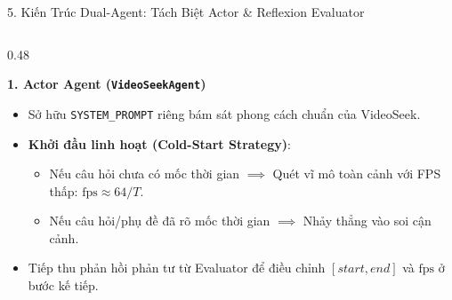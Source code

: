 \documentclass[aspectratio=169, 10pt]{beamer}
\begin{document}
\begin{frame}{5. Kiến Trúc Dual-Agent: Tách Biệt Actor \& Reflexion Evaluator}
    \begin{columns}[T]
        \begin{column}{0.48\textwidth}
            \begin{block}{\textbf{1. Actor Agent (\texttt{VideoSeekAgent})}}
                \begin{itemize}
                    \item Sở hữu \texttt{SYSTEM\_PROMPT} riêng bám sát phong cách chuẩn của VideoSeek.
                    \item \textbf{Khởi đầu linh hoạt (Cold-Start Strategy)}:
                    \begin{itemize}\footnotesize
                        \item Nếu câu hỏi chưa có mốc thời gian $\implies$ Quét vĩ mô toàn cảnh với FPS thấp: $\text{fps} \approx 64 / T$.
                        \item Nếu câu hỏi/phụ đề đã rõ mốc thời gian $\implies$ Nhảy thẳng vào soi cận cảnh.
                    \end{itemize}
                    \item Tiếp thu phản hồi phản tư từ Evaluator để điều chỉnh $[start, end]$ và $\text{fps}$ ở bước kế tiếp.
                \end{itemize}
            \end{block}
        \end{column}


\end{columns}
\end{frame}
\end{document}

